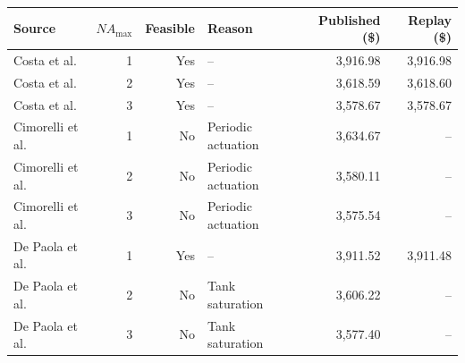 \begin{tabular}{@{}lrrlrr@{}}
  \hline
  Source & $NA_{\max}$ & Feasible & Reason & Published (\$) & Replay (\$) \\
  \hline
  Costa et al. & 1 & Yes & -- & 3{,}916.98 & 3{,}916.98 \\
  Costa et al. & 2 & Yes & -- & 3{,}618.59 & 3{,}618.60 \\
  Costa et al. & 3 & Yes & -- & 3{,}578.67 & 3{,}578.67 \\
  Cimorelli et al. & 1 & No & Periodic actuation & 3{,}634.67 & -- \\
  Cimorelli et al. & 2 & No & Periodic actuation & 3{,}580.11 & -- \\
  Cimorelli et al. & 3 & No & Periodic actuation & 3{,}575.54 & -- \\
  De Paola et al. & 1 & Yes & -- & 3{,}911.52 & 3{,}911.48 \\
  De Paola et al. & 2 & No & Tank saturation & 3{,}606.22 & -- \\
  De Paola et al. & 3 & No & Tank saturation & 3{,}577.40 & -- \\
  \hline
\end{tabular}
